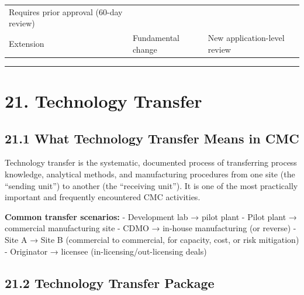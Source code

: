 \documentclass[
  11pt,
  a4paper,
]{report}
\begin{document}
\begin{longtable}[]{@{}lll@{}}
\begin{minipage}[t]{0.28\columnwidth}
Requires prior approval (60-day review)\strut
\end{minipage}\tabularnewline
\begin{minipage}[t]{0.21\columnwidth}\raggedright
Extension\strut
\end{minipage} & \begin{minipage}[t]{0.42\columnwidth}\raggedright
Fundamental change\strut
\end{minipage} & \begin{minipage}[t]{0.28\columnwidth}\raggedright
New application-level review\strut
\end{minipage}\tabularnewline
\bottomrule
\end{longtable}

\begin{center}\rule{0.5\linewidth}{0.5pt}\end{center}

\hypertarget{technology-transfer}{%
\section{21. Technology Transfer}\label{technology-transfer}}

\hypertarget{what-technology-transfer-means-in-cmc}{%
\subsection{21.1 What Technology Transfer Means in
CMC}\label{what-technology-transfer-means-in-cmc}}

Technology transfer is the systematic, documented process of
transferring process knowledge, analytical methods, and manufacturing
procedures from one site (the ``sending unit'') to another (the
``receiving unit''). It is one of the most practically important and
frequently encountered CMC activities.

\textbf{Common transfer scenarios:} - Development lab → pilot plant -
Pilot plant → commercial manufacturing site - CDMO → in-house
manufacturing (or reverse) - Site A → Site B (commercial to commercial,
for capacity, cost, or risk mitigation) - Originator → licensee
(in-licensing/out-licensing deals)

\hypertarget{technology-transfer-package}{%
\subsection{21.2 Technology Transfer
Package}\label{technology-transfer-package}}
\end{document}
